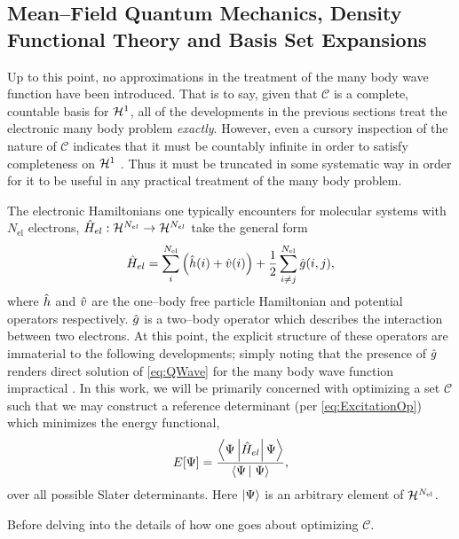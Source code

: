 \subsection{Mean--Field Quantum Mechanics, Density Functional Theory and Basis Set Expansions}
\label{sec:MF}

Up to this point, no approximations in the treatment of the many body wave function have been introduced. That is
to say, given that $\mathcal{C}$ is a complete, countable basis for $\mathcal{H}^1$, all of the developments
in the previous sections treat the electronic many body problem \emph{exactly}. However, even a cursory
inspection of the nature of $\mathcal{C}$ indicates that it must be countably infinite in order to 
satisfy completeness on $\mathcal{H}^1$ . Thus it must be truncated in some systematic
way in order for it to be useful in any practical treatment of the many body problem.

The electronic Hamiltonians one typically encounters for molecular systems with $N_\mathrm{el}$ electrons,
$\hat{H}_{el} : \mathcal{H}^{N_{el}} \rightarrow \mathcal{H}^{N_{el}}$ take the general form
\begin{equation}
\hat{H}_{el} = \sum_{i}^{N_\mathrm{el}} \left( \hat{h}(i) + \hat{v}(i) \right) + \frac{1}{2}\sum_{i \neq j}^{N_\mathrm{el}} \hat{g}(i,j),
\end{equation}
where $\hat{h}$ and $\hat{v}$ are the one--body free particle Hamiltonian and potential operators respectively.
$\hat{g}$ is a two--body operator which describes the interaction between two electrons.
At this point, the explicit structure of these operators are immaterial to the following developments; simply
noting that the presence of $\hat{g}$ renders direct solution of \cref{eq:QWave} for the many body
wave function impractical . 
In this work, we will be primarily concerned with optimizing a set $\mathcal{C}$ such that
we may construct a reference determinant (per \cref{eq:ExcitationOp}) which minimizes the energy functional,
\begin{equation}
\label{eq:EnergyFunctional}
E[\Psi] = \frac{\left\langle \Psi \left\vert \hat{H}_{el} \right\vert \Psi \right\rangle}{\left\langle \Psi \left\vert\right. \Psi \right\rangle},
\end{equation}
over all possible Slater determinants. Here $\left\vert \Psi \right\rangle$ is an arbitrary element of $\mathcal{H}^{N_{\mathrm{el}}}$.

Before delving into the details of how one goes about optimizing $\mathcal{C}$.






